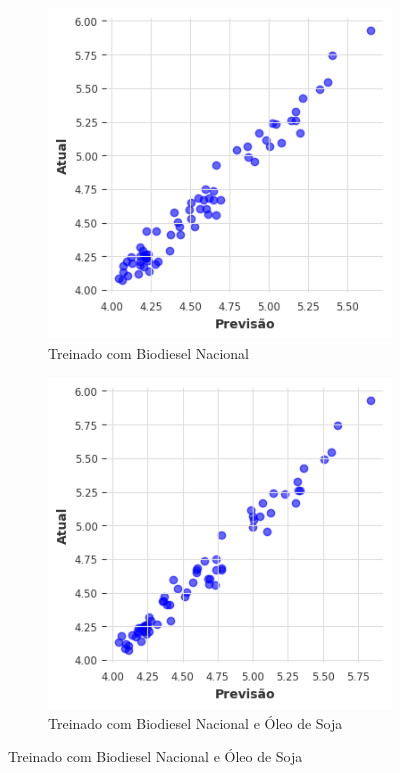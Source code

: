 \begin{figure}[htbp]
	\centering
	\begin{subfigure}[b]{0.40\textwidth}
		\centering
		\includegraphics[width=\textwidth]{figuras/nlinear_takens_brasil_scatter.png} %
		\caption{Treinado com Biodiesel Nacional \newline}
		\label{fig:nlinear_takens_brasil_scatter}
	\end{subfigure}
	\hfill
	\begin{subfigure}[b]{0.40\textwidth}
		\centering
		\includegraphics[width=\textwidth]{figuras/nlinear_takens_brasil_oil_scatter.png} %
		\caption{Treinado com Biodiesel Nacional e Óleo de Soja}
		\label{fig:nlinear_takens_brasil_oil_scatter}
	\end{subfigure}


\end{figure}
